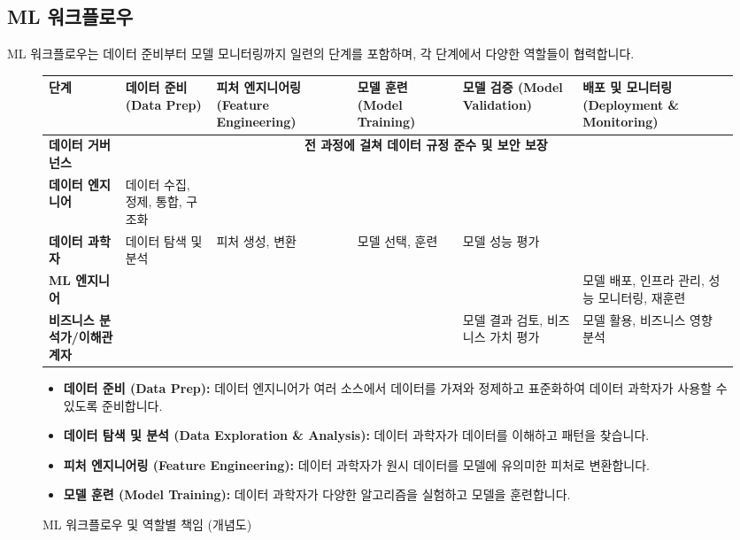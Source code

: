 \documentclass[11pt,a4paper]{article}
\theoremstyle{definition}
\begin{document}
\subsection{ML 워크플로우}

ML 워크플로우는 데이터 준비부터 모델 모니터링까지 일련의 단계를 포함하며, 각 단계에서 다양한 역할들이 협력합니다.

\begin{figure}[h!]
    \centering
    \caption{ML 워크플로우 및 역할별 책임 (개념도)}
    \label{fig:ml_workflow_roles}
    \begin{adjustbox}{width=\textwidth}
    \begin{tabular}{p{} | p{} | p{} | p{} | p{} | p{}}
    \toprule
    \textbf{단계} & \textbf{데이터 준비 (Data Prep)} & \textbf{피처 엔지니어링 (Feature Engineering)} & \textbf{모델 훈련 (Model Training)} & \textbf{모델 검증 (Model Validation)} & \textbf{배포 및 모니터링 (Deployment \& Monitoring)} \\
    \midrule
    \textbf{데이터 거버넌스} & \multicolumn{5}{c}{\textbf{전 과정에 걸쳐 데이터 규정 준수 및 보안 보장}} \\
    \textbf{데이터 엔지니어} & 데이터 수집, 정제, 통합, 구조화 & & & & \\
    \textbf{데이터 과학자} & 데이터 탐색 및 분석 & 피처 생성, 변환 & 모델 선택, 훈련 & 모델 성능 평가 & \\
    \textbf{ML 엔지니어} & & & & & 모델 배포, 인프라 관리, 성능 모니터링, 재훈련 \\
    \textbf{비즈니스 분석가/이해관계자} & & & & 모델 결과 검토, 비즈니스 가치 평가 & 모델 활용, 비즈니스 영향 분석 \\
    \bottomrule
    \end{tabular}
    \end{adjustbox}
    \vspace{1em}
    \begin{itemize}
        \item \textbf{데이터 준비 (Data Prep):} 데이터 엔지니어가 여러 소스에서 데이터를 가져와 정제하고 표준화하여 데이터 과학자가 사용할 수 있도록 준비합니다.
        \item \textbf{데이터 탐색 및 분석 (Data Exploration \& Analysis):} 데이터 과학자가 데이터를 이해하고 패턴을 찾습니다.
        \item \textbf{피처 엔지니어링 (Feature Engineering):} 데이터 과학자가 원시 데이터를 모델에 유의미한 피처로 변환합니다.
        \item \textbf{모델 훈련 (Model Training):} 데이터 과학자가 다양한 알고리즘을 실험하고 모델을 훈련합니다.

\end{itemize}
\end{figure}
\end{document}
